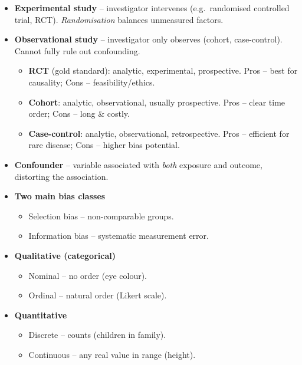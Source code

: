 \documentclass[12pt]{book}
\begin{document}
\begin{itemize}
  \item \textbf{Experimental study} – investigator intervenes  
        (e.g.\ randomised controlled trial, RCT).  
        \emph{Randomisation} balances unmeasured factors.
  \item \textbf{Observational study} – investigator only observes
        (cohort, case-control).  Cannot fully rule out confounding.

  \begin{itemize}
    \item \textbf{RCT} (gold standard): analytic, experimental, prospective.  
          Pros – best for causality; Cons – feasibility/ethics.
    \item \textbf{Cohort}: analytic, observational, usually prospective.  
          Pros – clear time order; Cons – long \& costly.
    \item \textbf{Case-control}: analytic, observational, retrospective.  
          Pros – efficient for rare disease; Cons – higher bias potential.
  \end{itemize}

  \item \textbf{Confounder} – variable associated with \emph{both}
        exposure and outcome, distorting the association.

  \item \textbf{Two main bias classes}
        \begin{itemize}
          \item Selection bias – non-comparable groups.
          \item Information bias – systematic measurement error.
        \end{itemize}

  \item \textbf{Qualitative (categorical)}  
        \begin{itemize}
          \item Nominal – no order (eye colour).  
          \item Ordinal – natural order (Likert scale).
        \end{itemize}
  \item \textbf{Quantitative}  
        \begin{itemize}
          \item Discrete – counts (children in family).  
          \item Continuous – any real value in range (height).
        \end{itemize}


\end{itemize}
\end{document}
